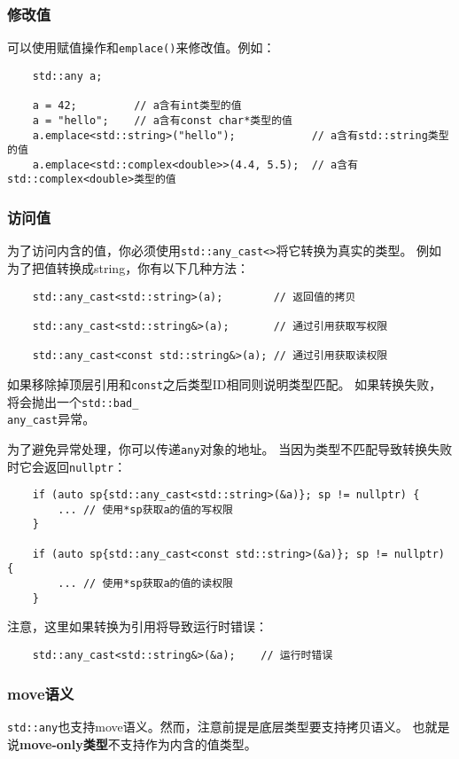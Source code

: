 \subsubsection{修改值}
可以使用赋值操作和\texttt{emplace()}来修改值。例如：
\begin{lstlisting}
    std::any a;

    a = 42;         // a含有int类型的值
    a = "hello";    // a含有const char*类型的值
    a.emplace<std::string>("hello");            // a含有std::string类型的值
    a.emplace<std::complex<double>>(4.4, 5.5);  // a含有std::complex<double>类型的值
\end{lstlisting}

\subsubsection{访问值}
为了访问内含的值，你必须使用\texttt{std::any\_cast<>}将它转换为真实的类型。
例如为了把值转换成string，你有以下几种方法：
\begin{lstlisting}
    std::any_cast<std::string>(a);        // 返回值的拷贝

    std::any_cast<std::string&>(a);       // 通过引用获取写权限

    std::any_cast<const std::string&>(a); // 通过引用获取读权限
\end{lstlisting}
如果移除掉顶层引用和\texttt{const}之后类型ID相同则说明类型匹配。
如果转换失败，将会抛出一个\texttt{std::bad\_\\
any\_cast}异常。

为了避免异常处理，你可以传递\texttt{any}对象的地址。
当因为类型不匹配导致转换失败时它会返回\texttt{nullptr}：
\begin{lstlisting}
    if (auto sp{std::any_cast<std::string>(&a)}; sp != nullptr) {
        ... // 使用*sp获取a的值的写权限
    }

    if (auto sp{std::any_cast<const std::string>(&a)}; sp != nullptr) {
        ... // 使用*sp获取a的值的读权限
    }
\end{lstlisting}
注意，这里如果转换为引用将导致运行时错误：
\begin{lstlisting}
    std::any_cast<std::string&>(&a);    // 运行时错误
\end{lstlisting}

\subsubsection{move语义}
\texttt{std::any}也支持move语义。然而，注意前提是底层类型要支持拷贝语义。
也就是说\textbf{move-only类型}不支持作为内含的值类型。

